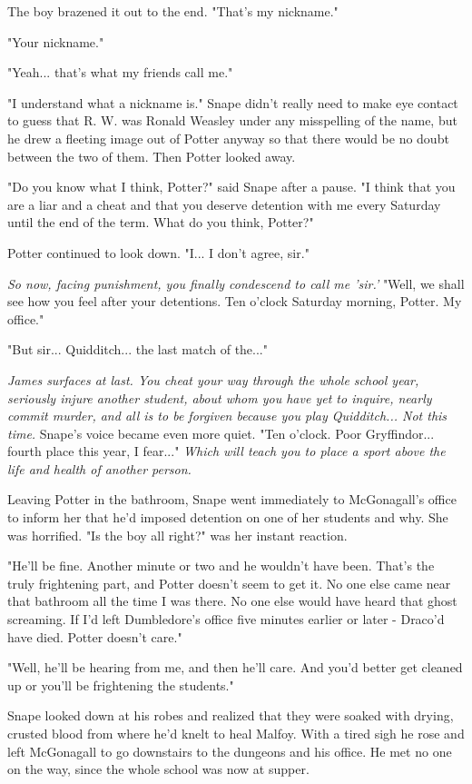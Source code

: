 \documentclass[a4paper,11pt]{article}
\begin{document}
The boy brazened it out to the end. "That's my nickname."

"Your nickname."

"Yeah... that's what my friends call me."

"I understand what a nickname is." Snape didn't really need to make eye contact to guess that R. W. was Ronald Weasley under any misspelling of the name, but he drew a fleeting image out of Potter anyway so that there would be no doubt between the two of them. Then Potter looked away.

"Do you know what I think, Potter?" said Snape after a pause. "I think that you are a liar and a cheat and that you deserve detention with me every Saturday until the end of the term. What do you think, Potter?"

Potter continued to look down. "I... I don't agree, sir."

\emph{So now, facing punishment, you finally condescend to call me 'sir.'} "Well, we shall see how you feel after your detentions. Ten o'clock Saturday morning, Potter. My office."

"But sir... Quidditch... the last match of the..."

\emph{James surfaces at last. You cheat your way through the whole school year, seriously injure another student, about whom you have yet to inquire, nearly commit murder, and all is to be forgiven because you play Quidditch... Not this time.} Snape's voice became even more quiet. "Ten o'clock. Poor Gryffindor... fourth place this year, I fear..." \emph{Which will teach you to place a sport above the life and health of another person.}

Leaving Potter in the bathroom, Snape went immediately to McGonagall's office to inform her that he'd imposed detention on one of her students and why. She was horrified. "Is the boy all right?" was her instant reaction.

"He'll be fine. Another minute or two and he wouldn't have been. That's the truly frightening part, and Potter doesn't seem to get it. No one else came near that bathroom all the time I was there. No one else would have heard that ghost screaming. If I'd left Dumbledore's office five minutes earlier or later - Draco'd have died. Potter doesn't care."

"Well, he'll be hearing from me, and then he'll care. And you'd better get cleaned up or you'll be frightening the students."

Snape looked down at his robes and realized that they were soaked with drying, crusted blood from where he'd knelt to heal Malfoy. With a tired sigh he rose and left McGonagall to go downstairs to the dungeons and his office. He met no one on the way, since the whole school was now at supper.
\end{document}
